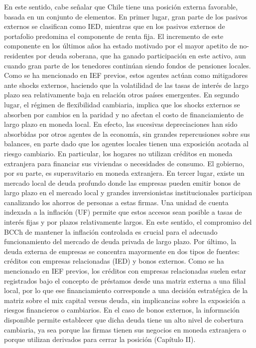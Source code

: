 \documentclass[
]{book}
\begin{document}
En este sentido, cabe señalar que Chile tiene una posición externa favorable,
basada en un conjunto de elementos. En primer lugar, gran parte de los
pasivos externos se clasifican como IED, mientras que en los pasivos externos
de portafolio predomina el componente de renta fija. El incremento de este
componente en los últimos años ha estado motivado por el mayor apetito
de no-residentes por deuda soberana, que ha ganado participación en este
activo, aun cuando gran parte de los tenedores continúan siendo fondos de
pensiones locales. Como se ha mencionado en IEF previos, estos agentes
actúan como mitigadores ante shocks externos, haciendo que la volatilidad
de las tasas de interés de largo plazo sea relativamente baja en relación otros
países emergentes. En segundo lugar, el régimen de flexibilidad cambiaria,
implica que los shocks externos se absorben por cambios en la paridad y
no afectan el costo de financiamiento de largo plazo en moneda local. En
efecto, las sucesivas depreciaciones han sido absorbidas por otros agentes
de la economía, sin grandes repercusiones sobre sus balances, en parte dado
que los agentes locales tienen una exposición acotada al riesgo cambiario.
En particular, los hogares no utilizan créditos en moneda extranjera para
financiar sus viviendas o necesidades de consumo. El gobierno, por su parte, es
superavitario en moneda extranjera. En tercer lugar, existe un mercado local de
deuda profundo donde las empresas pueden emitir bonos de largo plazo en el
mercado local y grandes inversionistas institucionales participan canalizando
los ahorros de personas a estas firmas. Una unidad de cuenta indexada a la
inflación (UF) permite que estos accesos sean posible a tasas de interés fijas y
por plazos relativamente largos. En este sentido, el compromiso del BCCh de
mantener la inflación controlada es crucial para el adecuado funcionamiento
del mercado de deuda privada de largo plazo. Por último, la deuda externa
de empresas se concentra mayormente en dos tipos de fuentes: créditos con
empresas relacionadas (IED) y bonos externos. Como se ha mencionado en
IEF previos, los créditos con empresas relacionadas suelen estar registrados
bajo el concepto de préstamos desde una matriz externa a una filial local,
por lo que ese financiamiento corresponde a una decisión estratégica de la
matriz sobre el mix capital versus deuda, sin implicancias sobre la exposición a
riesgos financieros o cambiarios. En el caso de bonos externos, la información
disponible permite establecer que dicha deuda tiene un alto nivel de cobertura
cambiaria, ya sea porque las firmas tienen sus negocios en moneda extranjera
o porque utilizan derivados para cerrar la posición (Capítulo II).
\end{document}
